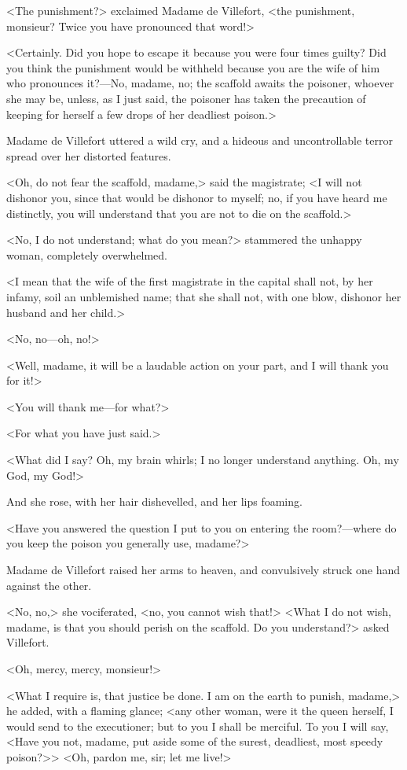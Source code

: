  <The punishment?> exclaimed Madame de Villefort, <the punishment, monsieur? Twice you have pronounced that word!> 

 <Certainly. Did you hope to escape it because you were four times guilty? Did you think the punishment would be withheld because you are the wife of him who pronounces it?—No, madame, no; the scaffold awaits the poisoner, whoever she may be, unless, as I just said, the poisoner has taken the precaution of keeping for herself a few drops of her deadliest poison.> 

 Madame de Villefort uttered a wild cry, and a hideous and uncontrollable terror spread over her distorted features. 

 <Oh, do not fear the scaffold, madame,> said the magistrate; <I will not dishonor you, since that would be dishonor to myself; no, if you have heard me distinctly, you will understand that you are not to die on the scaffold.> 

 <No, I do not understand; what do you mean?> stammered the unhappy woman, completely overwhelmed. 

 <I mean that the wife of the first magistrate in the capital shall not, by her infamy, soil an unblemished name; that she shall not, with one blow, dishonor her husband and her child.> 

 <No, no—oh, no!> 

 <Well, madame, it will be a laudable action on your part, and I will thank you for it!> 

 <You will thank me—for what?> 

 <For what you have just said.> 

 <What did I say? Oh, my brain whirls; I no longer understand anything. Oh, my God, my God!> 

 And she rose, with her hair dishevelled, and her lips foaming. 

 <Have you answered the question I put to you on entering the room?—where do you keep the poison you generally use, madame?> 

 Madame de Villefort raised her arms to heaven, and convulsively struck one hand against the other. 

 <No, no,> she vociferated, <no, you cannot wish that!>  <What I do not wish, madame, is that you should perish on the scaffold. Do you understand?> asked Villefort. 

 <Oh, mercy, mercy, monsieur!> 

 <What I require is, that justice be done. I am on the earth to punish, madame,> he added, with a flaming glance; <any other woman, were it the queen herself, I would send to the executioner; but to you I shall be merciful. To you I will say, <Have you not, madame, put aside some of the surest, deadliest, most speedy poison?>>  <Oh, pardon me, sir; let me live!> 

